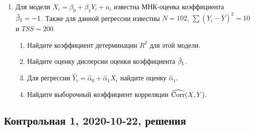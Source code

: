 \begin{enumerate}
\item Для модели $X_i = \beta_0 + \beta_1 Y_i + u_i$ известна МНК-оценка коэффициента $\hat{\beta}_1 = -1$. 
Также для данной регрессии известны $N=102$, $\sum (Y_i - \bar Y)^2=10$ и  $TSS=200$. 
\begin{enumerate}
    \item  Найдите коэффициент детерминации $R^2$ для этой модели.
\item Найдите оценку дисперсии оценки коэффициента $\hat{\beta}_1$.
\item Для регрессии $\hat Y_i = \hat\alpha_0 + \hat\alpha_1 X_i$ найдите оценку $\hat\alpha_1$.
\item Найдите выборочный коэффициент корреляции $\operatorname{\widehat{\operatorname{Corr}}}(X,Y)$.
\end{enumerate}



\end{enumerate}


\subsection{Контрольная 1, 2020-10-22, решения}

